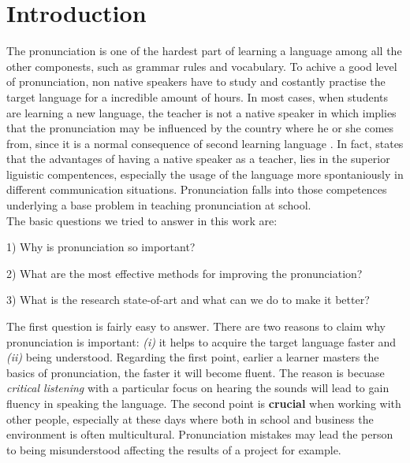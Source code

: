 \chapter{Introduction}
The pronunciation is one of the hardest part of learning a language among all the other componests, such as grammar rules and vocabulary. To achive a good level of pronunciation, non native speakers have to study and costantly practise the target language for a incredible amount of hours. In most cases, when students are learning a new language, the teacher is not a native speaker in which implies that the pronunciation may be influenced by the country where he or she comes from, since it is a normal consequence of second learning language \cite{derwing2005second}. In fact, \cite{medgyes2001teacher} states that the advantages of having a native speaker as a teacher, lies in the superior liguistic compentences, especially the usage of the language more spontaniously in different communication situations. Pronunciation falls into those competences underlying a base problem in teaching pronunciation at school.  \\

\noindent The basic questions we tried to answer in this work are:
\begin{compactitem}
    \item[1)] Why is pronunciation so important?
    \item[2)] What are the most effective methods for improving the pronunciation?
    \item[3)] What is the research state-of-art and what can we do to make it better?
\end{compactitem}

\vspace*{1em}

\noindent The first question is fairly easy to answer. There are two reasons to claim why pronunciation is important: \textit{(i)} it helps to acquire the target language faster and \textit{(ii)} being understood.
Regarding the first point, earlier a learner masters the basics of pronunciation, the faster it will become fluent. The reason is becuase \textit{critical listening} with a particular focus on hearing the sounds will lead to gain fluency in speaking the language.
The second point is \textbf{crucial} when working with other people, especially at these days where both in school and business the environment is often multicultural. Pronunciation mistakes may lead the person to being misunderstood affecting the results of a project for example. \\

